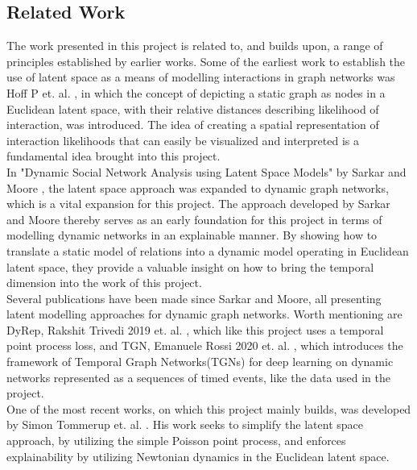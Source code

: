 \subsection{Related Work}
\label{sec:Intro:RelatedWork}
The work presented in this project is related to, and builds upon, a range of principles established by earlier works.
Some of the earliest work to establish the use of latent space as a means of modelling interactions in graph networks was Hoff P et. al. \cite{Hoff2002LatentAnalysis}, in which the concept of depicting a static graph as nodes in a Euclidean latent space, with their relative distances describing likelihood of interaction, was introduced. The idea of creating a spatial representation of interaction likelihoods that can easily be visualized and interpreted is a fundamental idea brought into this project.
\\
In "Dynamic Social Network Analysis using Latent Space Models" by Sarkar and Moore \cite{Sarkar2005DynamicModels}, the latent space approach was expanded to dynamic graph networks, which is a vital expansion for this project.
The approach developed by Sarkar and Moore thereby serves as an early foundation for this project in terms of modelling dynamic networks in an explainable manner. By showing how to translate a static model of relations into a dynamic model operating in Euclidean latent space, they provide a valuable insight on how to bring the temporal dimension into the work of this project.
\\
Several publications have been made since Sarkar and Moore, all presenting latent modelling approaches for dynamic graph networks. Worth mentioning are DyRep, Rakshit Trivedi 2019 et. al. \cite{Trivedi2019DYREP:GRAPHS}, which like this project uses a temporal point process loss, and TGN, Emanuele Rossi 2020 et. al. \cite{Rossi2020TEMPORALGRAPHS}, which introduces the framework of Temporal Graph Networks(TGNs) for deep learning on dynamic networks represented as a sequences of timed events, like the data used in the project.
 \\
One of the most recent works, on which this project mainly builds, was developed by Simon Tommerup et. al. \cite{Tommerup2021LearningNetworks}.
His work seeks to simplify the latent space approach, by utilizing the simple Poisson point process, and enforces explainability by utilizing Newtonian dynamics in the Euclidean latent space.



